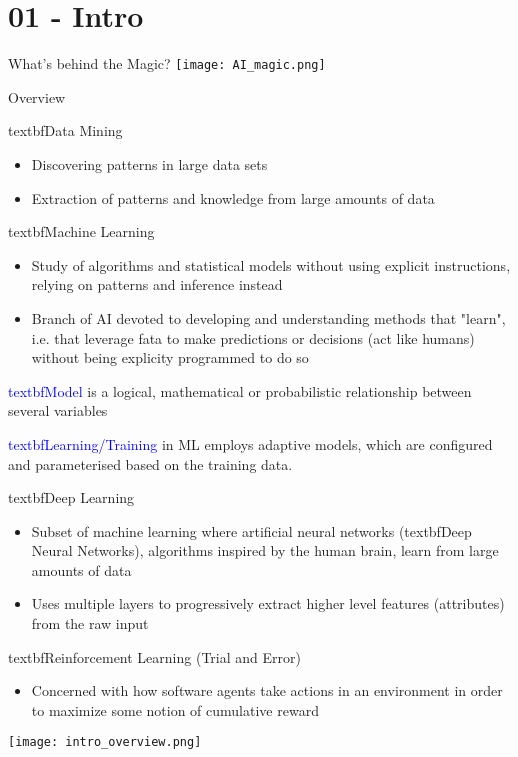 \section{01 - Intro}

\begin{definition}{What's behind the Magic?} 
    \texttt{[image: AI\_magic.png]}
\end{definition}

\begin{theorem}{Overview}

    \textcolor{frog}{textbf{Data Mining}}
    \begin{itemize}
        \item Discovering patterns in large data sets
        \item Extraction of patterns and knowledge from large amounts of data
    \end{itemize}

    \textcolor{frog}{textbf{Machine Learning}}
    \begin{itemize}
        \item Study of algorithms and statistical models without using explicit instructions, relying on patterns and inference instead
        \item Branch of AI devoted to developing and understanding methods that "learn", i.e. that leverage fata to make predictions or decisions (act like humans) without being explicity programmed to do so
    \end{itemize}

    \textcolor{blue}{textbf{Model}} is a logical, mathematical or probabilistic relationship between several variables

    \textcolor{blue}{textbf{Learning/Training}} in ML employs adaptive models, which are configured and parameterised based on the training data.

    \textcolor{frog}{textbf{Deep Learning}}
    \begin{itemize}
        \item Subset of machine learning where artificial neural networks (\textcolor{frog}{textbf{Deep Neural Networks}}), algorithms inspired by the human brain, learn from large amounts of data
        \item Uses multiple layers to progressively extract higher level features (attributes) from the raw input
    \end{itemize}

    \textcolor{frog}{textbf{Reinforcement Learning}} (Trial and Error)
    \begin{itemize}
        \item Concerned with how software agents take actions in an environment in order to maximize some notion of cumulative reward
    \end{itemize}

    \texttt{[image: intro\_overview.png]}
\end{theorem}

